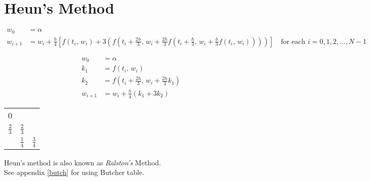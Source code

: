 \documentclass[../main-sheet.tex]{subfiles}
\begin{document}
\section{Heun's Method}
\begin{align*}
    w_0 & = \alpha\\
    w_{i+1} & = w_i + \frac{h}{4} \left[ f(t_i,\,w_i) + 3\left(f\left(t_{i} + \frac{2h}{3},\,w_i+\frac{2h}{3}f\left(t_i+\frac{h}{3},\,w_i+\frac{h}{3}f(t_i,\,w_i)\right)\right)\right) \right] \quad \text{for each } i=0,1,2,\dots,N-1
\end{align*}
\begin{center}
    \begin{minipage}[c]{.4\textwidth}
        \begin{align*}
            w_0&=\alpha\\
            k_1&=f(t_i,\,w_i)\\
            k_2&=f\left(t_i+\frac{2h}{3},\,w_i+\frac{2h}{3}k_1\right)\\
            w_{i+1}&=w_i+\frac{h}{4}\left( k_1+3k_2 \right)
        \end{align*}
    \end{minipage}
    \begin{minipage}[c]{.4\textwidth}
        \centering
        \begin{tabular}{c|cc}
            0 & & \\[.5 em]
            \(\frac{2}{3}\) & \(\frac{2}{3}\) & \\[0.5em]
            \hline
            \Tstrut & \(\frac{1}{4}\) & \(\frac{3}{4}\) \\
        \end{tabular}
    \end{minipage}
\end{center}
\begin{rem}
    Heun's method is also known as \emph{Ralston's} Method.\\
    See appendix \ref{butch} for using Butcher table.
\end{rem}
\end{document}
